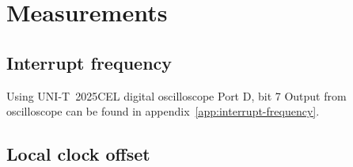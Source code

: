 
\chapter{Measurements}\label{chap:measurements}

\section{Interrupt frequency}
Using UNI-T~2025CEL digital oscilloscope
Port D, bit 7
Output from oscilloscope
can be found in appendix~\ref{app:interrupt-frequency}.

\section{Local clock offset}

